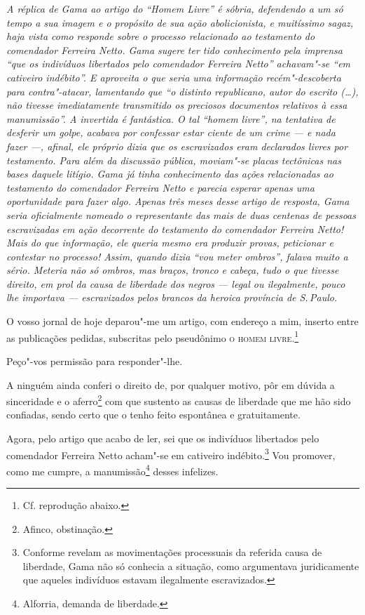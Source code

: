 \begin{flushleft}
{\footnotesize\itshape
A réplica de Gama ao artigo do ``Homem Livre'' é sóbria, defendendo
a um só tempo a sua imagem e o propósito de sua ação abolicionista, e
muitíssimo sagaz, haja vista como responde sobre o processo relacionado
ao testamento do comendador Ferreira Netto. Gama sugere ter tido
conhecimento pela imprensa ``que os indivíduos libertados pelo comendador
Ferreira Netto'' achavam"-se ``em cativeiro indébito''. E aproveita o que
seria uma informação recém"-descoberta para contra"-atacar, lamentando que
``o distinto republicano, autor do escrito (\ldots{}), não tivesse
imediatamente transmitido os preciosos documentos relativos à essa
manumissão''. A invertida é fantástica. O tal ``homem livre'', na tentativa
de desferir um golpe, acabava por confessar estar ciente de um crime ---
e nada fazer ---, afinal, ele próprio dizia que os escravizados eram
declarados livres por testamento. Para além da discussão pública,
moviam"-se placas tectônicas nas bases daquele litígio. Gama já tinha
conhecimento das ações relacionadas ao testamento do comendador Ferreira
Netto e parecia esperar apenas uma oportunidade para fazer algo. Apenas
três meses desse artigo de resposta, Gama seria oficialmente nomeado o
representante das mais de duas centenas de pessoas escravizadas em ação
decorrente do testamento do comendador Ferreira Netto! Mais do que
informação, ele queria mesmo era produzir provas, peticionar e
contestar no processo! Assim, quando dizia ``vou meter ombros'', falava
muito a sério. Meteria não só ombros, mas braços, tronco e cabeça, tudo
o que tivesse direito, em prol da causa de liberdade dos negros --- legal
ou ilegalmente, pouco lhe importava --- escravizados pelos brancos da
heroica província de S.\,Paulo. }
\end{flushleft}

O vosso jornal de hoje deparou"-me um artigo, com endereço a mim, inserto
entre as publicações pedidas, subscritas pelo pseudônimo \textsc{o homem
livre}.\footnote{Cf. reprodução abaixo.}

Peço"-vos permissão para responder"-lhe.

A ninguém ainda conferi o direito de, por qualquer motivo, pôr em dúvida
a sinceridade e o aferro\footnote{Afinco, obstinação.} com que
sustento as causas de liberdade que me hão sido confiadas, sendo certo
que o tenho feito espontânea e gratuitamente.

Agora, pelo artigo que acabo de ler, sei que os indivíduos libertados
pelo comendador Ferreira Netto acham"-se em cativeiro indébito.\footnote{Conforme revelam as movimentações processuais da referida causa de
  liberdade, Gama não só conhecia a situação, como argumentava
  juridicamente que aqueles indivíduos estavam ilegalmente escravizados.}
Vou promover, como me cumpre, a manumissão\footnote{Alforria, demanda
  de liberdade.} desses infelizes.


